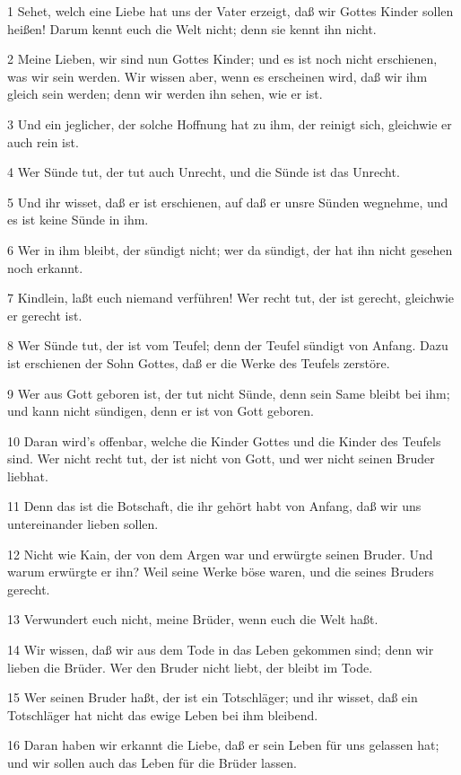 \par 1 Sehet, welch eine Liebe hat uns der Vater erzeigt, daß wir Gottes Kinder sollen heißen! Darum kennt euch die Welt nicht; denn sie kennt ihn nicht.
\par 2 Meine Lieben, wir sind nun Gottes Kinder; und es ist noch nicht erschienen, was wir sein werden. Wir wissen aber, wenn es erscheinen wird, daß wir ihm gleich sein werden; denn wir werden ihn sehen, wie er ist.
\par 3 Und ein jeglicher, der solche Hoffnung hat zu ihm, der reinigt sich, gleichwie er auch rein ist.
\par 4 Wer Sünde tut, der tut auch Unrecht, und die Sünde ist das Unrecht.
\par 5 Und ihr wisset, daß er ist erschienen, auf daß er unsre Sünden wegnehme, und es ist keine Sünde in ihm.
\par 6 Wer in ihm bleibt, der sündigt nicht; wer da sündigt, der hat ihn nicht gesehen noch erkannt.
\par 7 Kindlein, laßt euch niemand verführen! Wer recht tut, der ist gerecht, gleichwie er gerecht ist.
\par 8 Wer Sünde tut, der ist vom Teufel; denn der Teufel sündigt von Anfang. Dazu ist erschienen der Sohn Gottes, daß er die Werke des Teufels zerstöre.
\par 9 Wer aus Gott geboren ist, der tut nicht Sünde, denn sein Same bleibt bei ihm; und kann nicht sündigen, denn er ist von Gott geboren.
\par 10 Daran wird's offenbar, welche die Kinder Gottes und die Kinder des Teufels sind. Wer nicht recht tut, der ist nicht von Gott, und wer nicht seinen Bruder liebhat.
\par 11 Denn das ist die Botschaft, die ihr gehört habt von Anfang, daß wir uns untereinander lieben sollen.
\par 12 Nicht wie Kain, der von dem Argen war und erwürgte seinen Bruder. Und warum erwürgte er ihn? Weil seine Werke böse waren, und die seines Bruders gerecht.
\par 13 Verwundert euch nicht, meine Brüder, wenn euch die Welt haßt.
\par 14 Wir wissen, daß wir aus dem Tode in das Leben gekommen sind; denn wir lieben die Brüder. Wer den Bruder nicht liebt, der bleibt im Tode.
\par 15 Wer seinen Bruder haßt, der ist ein Totschläger; und ihr wisset, daß ein Totschläger hat nicht das ewige Leben bei ihm bleibend.
\par 16 Daran haben wir erkannt die Liebe, daß er sein Leben für uns gelassen hat; und wir sollen auch das Leben für die Brüder lassen.
